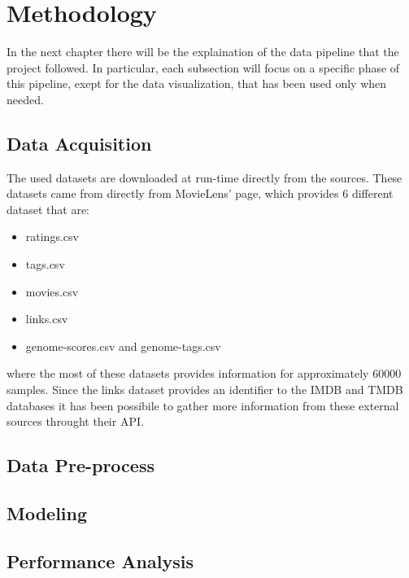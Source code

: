 \documentclass[../main]{subfiles}
\begin{document}
\chapter{Methodology}
In the next chapter there will be the explaination of the data pipeline that the project followed. In particular, each subsection will focus on a specific phase of this pipeline, exept for the data visualization, that has been used only when needed.
\section{Data Acquisition}
The used datasets are downloaded at run-time directly from the sources. These datasets came from directly from MovieLens' page, which provides 6 different dataset that are:
\begin{itemize}
    \item ratings.csv
    \item tags.csv
    \item movies.csv
    \item links.csv
    \item genome-scores.csv and genome-tags.csv
\end{itemize}
where the most of these datasets provides information for approximately 60000 samples. Since the links dataset provides an identifier to the IMDB and TMDB databases it has been possibile to gather more information from these external sources throught their API\cite{API-TMDB}\cite{API-IMDB}. 
\section{Data Pre-process}
\section{Modeling}
\section{Performance Analysis}
\end{document}
